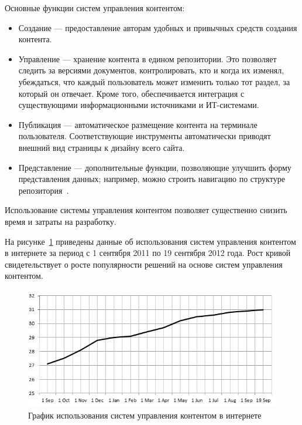 Основные функции систем управления контентом:
\begin{itemize}
\item
  Создание --- предоставление авторам удобных и привычных средств создания контента.

\item
  Управление --- хранение контента в едином репозитории. 
  Это позволяет следить за версиями документов, контролировать, кто и когда их изменял, убеждаться,
  что каждый пользователь может изменить только тот раздел, за который он отвечает.
  Кроме того, обеспечивается интеграция с существующими информационными источниками и ИТ-системами.

\item
  Публикация --- автоматическое размещение контента на терминале пользователя. 
  Соответствующие инструменты автоматически приводят внешний вид страницы к дизайну всего сайта.

\item
  Представление --- дополнительные функции, позволяющие улучшить форму представления данных; например,
  можно строить навигацию по структуре репозитория~\cite{osp_cms_functions}.
\end{itemize}

Использование системы управления контентом позволяет существенно снизить время и затраты на разработку.

На рисунке~\ref{fig:cms_usage_dynamic} приведены данные об использования систем управления контентом в интернете за период
с 1 сентября 2011 по 19 сентября 2012 года. Рост кривой свидетельствует о росте популярности решений на 
основе систем управления контентом.

\begin{figure}[h]
  \centering
  \includegraphics[width=150mm]{pic/dynamic_cms_usage.png}
  \caption{График использования систем управления контентом в интернете}
  \label{fig:cms_usage_dynamic}
\end{figure}


